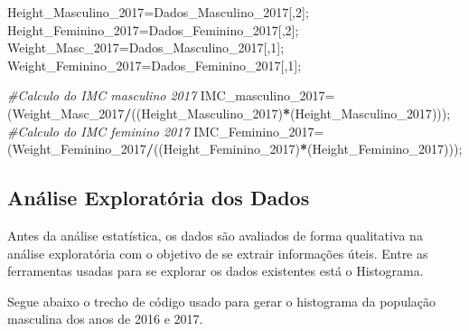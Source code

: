 \documentclass[]{article}
\newenvironment{Shaded}{\begin{snugshade}}{\end{snugshade}}
\newcommand{\CommentTok}[1]{\textcolor[rgb]{0.56,0.35,0.01}{\textit{#1}}}
\newcommand{\DecValTok}[1]{\textcolor[rgb]{0.00,0.00,0.81}{#1}}
\newcommand{\NormalTok}[1]{#1}
\newcommand{\OperatorTok}[1]{\textcolor[rgb]{0.81,0.36,0.00}{\textbf{#1}}}
\begin{document}
\begin{Shaded}
\begin{Highlighting}[]
\NormalTok{Height_Masculino_}\DecValTok{2017}\NormalTok{=Dados_Masculino_}\DecValTok{2017}\NormalTok{[,}\DecValTok{2}\NormalTok{];}
\NormalTok{Height_Feminino_}\DecValTok{2017}\NormalTok{=Dados_Feminino_}\DecValTok{2017}\NormalTok{[,}\DecValTok{2}\NormalTok{];}
\NormalTok{Weight_Masc_}\DecValTok{2017}\NormalTok{=Dados_Masculino_}\DecValTok{2017}\NormalTok{[,}\DecValTok{1}\NormalTok{];}
\NormalTok{Weight_Feminino_}\DecValTok{2017}\NormalTok{=Dados_Feminino_}\DecValTok{2017}\NormalTok{[,}\DecValTok{1}\NormalTok{];}

\CommentTok{#Calculo do IMC masculino 2017}
\NormalTok{IMC_masculino_}\DecValTok{2017}\NormalTok{=(Weight_Masc_}\DecValTok{2017}\OperatorTok{/}\NormalTok{((Height_Masculino_}\DecValTok{2017}\NormalTok{)}\OperatorTok{*}\NormalTok{(Height_Masculino_}\DecValTok{2017}\NormalTok{)));}
\CommentTok{#Calculo do IMC feminino 2017}
\NormalTok{IMC_Feminino_}\DecValTok{2017}\NormalTok{=(Weight_Feminino_}\DecValTok{2017}\OperatorTok{/}\NormalTok{((Height_Feminino_}\DecValTok{2017}\NormalTok{)}\OperatorTok{*}\NormalTok{(Height_Feminino_}\DecValTok{2017}\NormalTok{)));}
\end{Highlighting}
\end{Shaded}

\hypertarget{analise-exploratoria-dos-dados}{%
\subsection{Análise Exploratória dos
Dados}\label{analise-exploratoria-dos-dados}}

Antes da análise estatística, os dados são avaliados de forma
qualitativa na análise exploratória com o objetivo de se extrair
informações úteis. Entre as ferramentas usadas para se explorar os dados
existentes está o Histograma.

Segue abaixo o trecho de código usado para gerar o histograma da
população masculina dos anos de 2016 e 2017.
\end{document}
